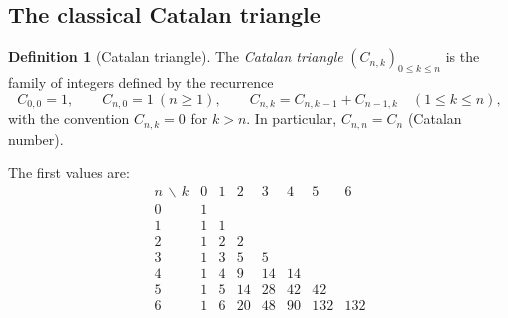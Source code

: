 \documentclass[12pt,a4paper,reqno]{amsart}
\theoremstyle{plain}
\theoremstyle{definition}
\newtheorem{definition}[theorem]{Definition}
\begin{document}
\subsection{The classical Catalan triangle}
\begin{definition}[Catalan triangle]\label{def:cat}
The \emph{Catalan triangle} $(C_{n,k})_{0\le k\le n}$ is
the family of integers defined by the recurrence
\begin{equation}\label{eq:rec_class}
C_{0,0}=1,\qquad C_{n,0}=1\ (n\ge1),\qquad
C_{n,k} = C_{n,k-1}+C_{n-1,k}\quad (1\le k\le n),
\end{equation}
with the convention $C_{n,k}=0$ for $k>n$.
In particular, $C_{n,n}=C_n$ (Catalan number).
\end{definition}
The first values are:
\[\begin{array}{c|ccccccc}
n\,\backslash\, k & 0 & 1 & 2 & 3 & 4 & 5 & 6\\\hline
0 & 1 \\ 1 & 1 & 1 \\ 2 & 1 & 2 & 2 \\ 3 & 1 & 3 & 5 & 5 \\
4 & 1 & 4 & 9 & 14 & 14 \\ 5 & 1 & 5 & 14 & 28 & 42 & 42\\
6 & 1 & 6 & 20 & 48 & 90 & 132 & 132
\end{array}\]
\end{document}
